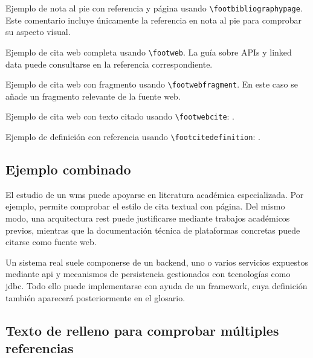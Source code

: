 Ejemplo de nota al pie con referencia y página usando \texttt{\textbackslash footbibliographypage}. Este comentario incluye únicamente la referencia en nota al pie para comprobar su aspecto visual.

Ejemplo de cita web completa usando \texttt{\textbackslash footweb}. La guía sobre APIs y linked data puede consultarse en la referencia correspondiente.

Ejemplo de cita web con fragmento usando \texttt{\textbackslash footwebfragment}. En este caso se añade un fragmento relevante de la fuente web.

Ejemplo de cita web con texto citado usando \texttt{\textbackslash footwebcite}: .

Ejemplo de definición con referencia usando \texttt{\textbackslash footcitedefinition}: .

\subsection*{Ejemplo combinado}

El estudio de un \acrshort{wms} puede apoyarse en literatura académica especializada. Por ejemplo,  permite comprobar el estilo de cita textual con página. Del mismo modo, una arquitectura \acrshort{rest} puede justificarse mediante trabajos académicos previos, mientras que la documentación técnica de plataformas concretas puede citarse como fuente web.

Un sistema real suele componerse de un \gls{backend}, uno o varios servicios expuestos mediante \acrshort{api} y mecanismos de persistencia gestionados con tecnologías como \gls{jdbc}. Todo ello puede implementarse con ayuda de un \gls{framework}, cuya definición también aparecerá posteriormente en el glosario.

\subsection*{Texto de relleno para comprobar múltiples referencias}

